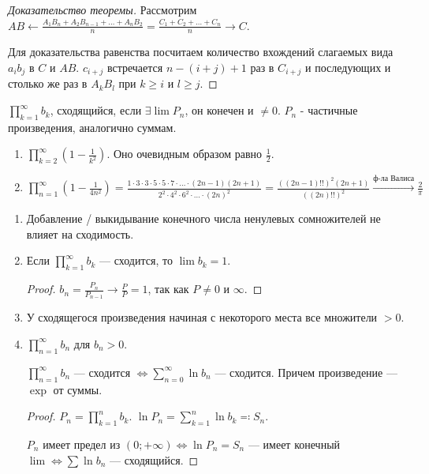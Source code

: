 \begin{proof}[Доказательство теоремы]
    Рассмотрим $AB \leftarrow \frac{A_1 B_n + A_2 B_{n-1} + \ldots + A_nB_2}{n} = \frac{C_1 + C_2 + \ldots + C_n}{n} \to C$.

    Для доказательства равенства посчитаем количество вхождений слагаемых вида $a_i b_j$ в $C$ и $AB$. $c_{i+j}$ встречается $n - (i + j) + 1$ раз в $C_{i+j}$ и последующих и столько же раз в $A_k B_l$ при $k \ge i$ и $l \ge j$.
\end{proof}
\begin{definition}
    $\prod\limits_{k=1}^\infty b_k$, сходящийся, если  $\exists \lim P_n$, он конечен и  $\neq 0$. $P_n$ - частичные произведения, аналогично суммам.
\end{definition}
\begin{example}
    \begin{enumerate}
        \item $\prod\limits_{k=2}^\infty \left(1-\frac{1}{k^2}\right)$. Оно очевидным образом равно $\frac{1}{2}$.
        \item $\prod_{n=1}^\infty(1 - \frac{1}{4n^2}) = \frac{1 \cdot 3 \cdot 3 \cdot 5 \cdot 5 \cdot 7 \cdot \ldots \cdot (2n-1)(2n+1)}{2^2 \cdot 4^2 \cdot 6^2 \cdot \dots \cdot (2n)^2 } = \frac{((2n-1)!!)^2(2n+1)}{((2n)!!)^2} \xrightarrow{\text{ф-ла Валиса}} \frac{2}{\pi}$
    \end{enumerate}
\end{example}
\begin{properties}
    \begin{enumerate}
        \item Добавление / выкидывание конечного числа ненулевых сомножителей не влияет на сходимость.
        \item Если  $\prod\limits_{k=1}^\infty b_k$ --- сходится, то  $\lim b_k = 1$.
             \begin{proof}
                $b_n = \frac{P_n}{P_{n-1}} \to \frac{P}{P} = 1$, так как $P \neq 0$ и  $\infty$.
            \end{proof}
        \item У сходящегося произведения начиная с некоторого места все множители $>0$. 
        \item  $\prod\limits_{n=1}^\infty b_n$ для  $b_n > 0$. 

             $\prod\limits_{n=1}^\infty b_n$ --- сходится  $\iff \sum\limits_{n = 0}^\infty \ln b_n$ --- сходится. Причем произведение --- $\exp$ от суммы.
\begin{proof}
    $P_n = \prod\limits_{k=1}^n b_k$.  $\ln P_n = \sum\limits_{k=1}^n \ln b_k \eqqcolon S_n$.

     $P_n$ имеет предел из  $(0; +\infty) \iff \ln P_n = S_n$ --- имеет конечный  $\lim \iff \sum \ln b_n$ --- сходящийся.
\end{proof}

    \end{enumerate}
\end{properties}

